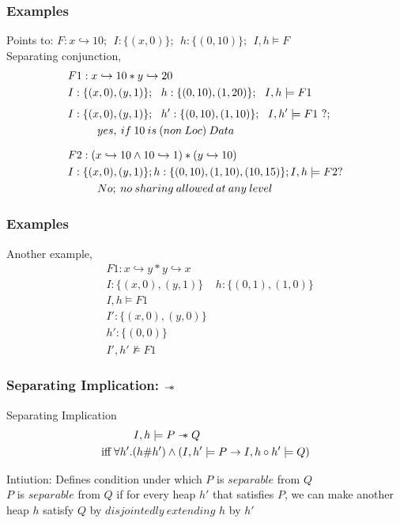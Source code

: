 \documentclass{beamer}
\newcommand\sepimp{\mathrel{-\mkern-6mu*}}
\begin{document}
\begin{frame}
\frametitle{Examples}
Points to: 
 $F : x \hookrightarrow 10;~~I : \{(x,0)\};~~h : \{(0,10)\};~~I,h \models F$ \\[0.4cm]
 

Separating conjunction,
\begin{align*}
    & F1 : x \hookrightarrow 10 * y \hookrightarrow 20 \\
    & I : \{ (x,0), (y,1) \};~~h : \{(0,10), (1,20)\};~~I,h \models F1 \\[0.15cm]
    & I : \{ (x,0), (y,1) \};~~h' : \{(0,10), (1,10)\};~~I,h' \models F1~?; \\
    &~~~~~~~~\tiny{yes,~if~10~is~(non~Loc)~Data}\\[0.25cm]
    & F2: (x \hookrightarrow 10 \land 10 \hookrightarrow 1) * (y \hookrightarrow 10) \\
    & I : \{(x,0), (y,1)\}; h: \{ (0, 10), (1, 10), (10, 15)\}; I, h \models F2 ?\\
    &~~~~~~~~\tiny{No;~no~sharing~allowed~at~any~level}
\end{align*}
\end{frame}

\begin{frame}
\frametitle{Examples}
Another example,
\begin{align*}
    & F1 : x \hookrightarrow y * y \hookrightarrow x  \\
    & I : \{(x,0), (y,1)\}
    & h : \{(0,1), (1, 0)\} \\
    & I,h \models F1 \\[0.15cm]
    & I' : \{(x,0), (y,0)\} \\
    & h' : \{(0,0)\} \\
    & I',h' \not\models F1
    \end{align*}
\end{frame}

\begin{frame}
\frametitle{Separating Implication: $\sepimp$}

Separating Implication
\begin{align*}
    I,h \models P \sepimp Q \hspace{3.5cm} \\ 
    \textrm{iff} \; \forall h'.(h \# h') \land (I,h' \models P \to I,h \circ h' \models Q)
\end{align*}

Intiution: Defines condition under which $P$ is $separable$ from $Q$ \\[0.15cm]
$P$ is $separable$ from $Q$ if for every heap $h'$ that satisfies $P$, we can make another heap $h$ satisfy $Q$ by $disjointedly~extending$ $h$ by $h'$

\end{frame}
\end{document}
